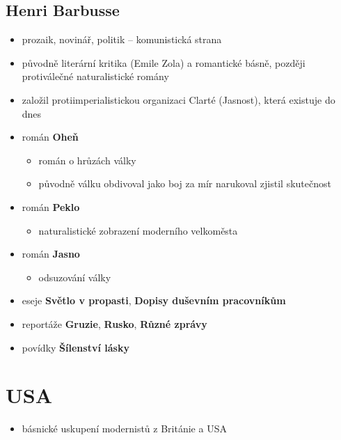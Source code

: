 \subsection{Henri Barbusse}
\begin{itemize}
\item prozaik, novinář, politik -- komunistická strana
\item původně literární kritika (Emile Zola) a romantické básně, později protiválečné naturalistické romány
\item založil protiimperialistickou organizaci Clarté (Jasnost), která existuje do dnes
\item román \textbf{Oheň}
	\begin{itemize}
	\item román o hrůzách války
	\item původně válku obdivoval jako boj za mír \ra narukoval \ra zjistil skutečnost
	\end{itemize}
\item román \textbf{Peklo}
	\begin{itemize}
	\item naturalistické zobrazení moderního velkoměsta
	\end{itemize}
\item román \textbf{Jasno}
	\begin{itemize}
	\item odsuzování války
	\end{itemize}
\item eseje \textbf{Světlo v propasti}, \textbf{Dopisy duševním pracovníkům}
\item reportáže \textbf{Gruzie}, \textbf{Rusko}, \textbf{Různé zprávy}
\item povídky \textbf{Šílenství lásky}
\end{itemize}



\section{USA}
\begin{itemize}
\item básnické uskupení modernistů z Británie a USA
\end{itemize}

